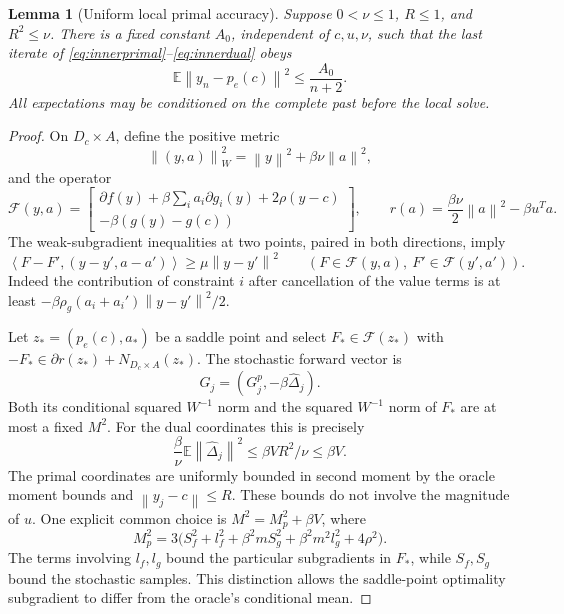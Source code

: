 \documentclass[11pt,a4paper]{article}
\newcommand{\E}{\mathbb E}
\newcommand{\norm}[1]{\left\lVert#1\right\rVert}
\newcommand{\ip}[2]{\left\langle#1,#2\right\rangle}
\newtheorem{lemma}[theorem]{Lemma}
\theoremstyle{remark}
\numberwithin{equation}{section}
\begin{document}
\begin{lemma}[Uniform local primal accuracy]\label{lem:localsolver}
Suppose $0<\nu\le1$, $R\le1$, and $R^2\le\nu$. There is a fixed constant $A_0$, independent of $c,u,\nu$, such that the last iterate of \eqref{eq:innerprimal}--\eqref{eq:innerdual} obeys
\begin{equation}
 \E\norm{y_n-p_e(c)}^2\le \frac{A_0}{n+2}.
 \label{eq:inneraccuracy}
\end{equation}
All expectations may be conditioned on the complete past before the local solve.
\end{lemma}
\begin{proof}
On $D_c\times A$, define the positive metric
\[
 \norm{(y,a)}_W^2=\norm y^2+\beta\nu\norm a^2,
\]
and the operator
\[
 \mathcal F(y,a)=\begin{bmatrix}
 \partial f(y)+\beta\sum_i a_i\partial g_i(y)+2\rho(y-c)\\
 -\beta(g(y)-g(c))
 \end{bmatrix},
 \qquad r(a)=\frac{\beta\nu}{2}\norm a^2-\beta u^T a.
\]
The weak-subgradient inequalities at two points, paired in both directions, imply
\begin{equation}
 \ip{F-F'}{(y-y',a-a')}\ge\mu\norm{y-y'}^2
 \qquad(F\in\mathcal F(y,a),\ F'\in\mathcal F(y',a')).
 \label{eq:partialstrong}
\end{equation}
Indeed the contribution of constraint $i$ after cancellation of the value terms is at least $-\beta\rho_g(a_i+a_i')\norm{y-y'}^2/2$.

Let $z_*=(p_e(c),a_*)$ be a saddle point and select $F_*\in\mathcal F(z_*)$ with $-F_*\in\partial r(z_*)+N_{D_c\times A}(z_*)$. The stochastic forward vector is
\[
 G_j=(G^p_j,-\beta\widehat\Delta_j).
\]
Both its conditional squared $W^{-1}$ norm and the squared $W^{-1}$ norm of $F_*$ are at most a fixed $M^2$. For the dual coordinates this is precisely
\[
 \frac{\beta}{\nu}\E\norm{\widehat\Delta_j}^2\le\beta V R^2/\nu\le\beta V.
\]
The primal coordinates are uniformly bounded in second moment by the oracle moment bounds and $\norm{y_j-c}\le R$. These bounds do not involve the magnitude of $u$.
One explicit common choice is $M^2=M_p^2+\beta V$, where
\[
 M_p^2=3\bigl(S_f^2+l_f^2+\beta^2mS_g^2+\beta^2m^2l_g^2+4\rho^2\bigr).
\]
The terms involving $l_f,l_g$ bound the particular subgradients in $F_*$, while $S_f,S_g$ bound the stochastic samples. This distinction allows the saddle-point optimality subgradient to differ from the oracle's conditional mean.


\end{proof}
\end{document}
